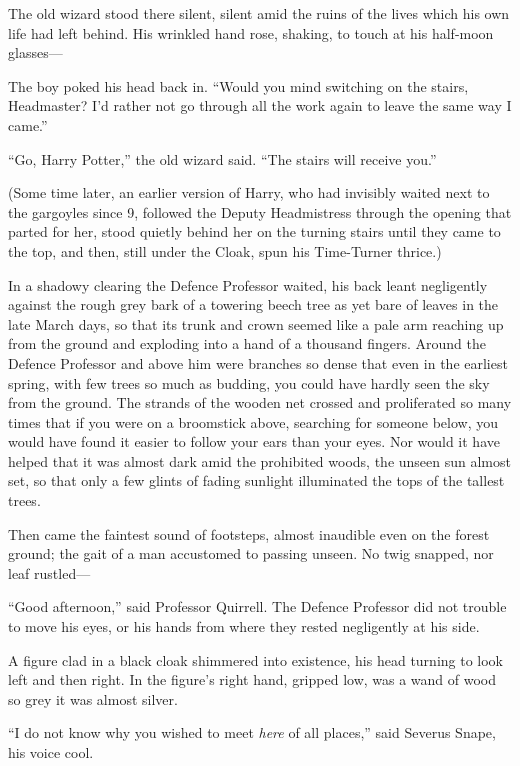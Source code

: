 The old wizard stood there silent, silent amid the ruins of the lives which his own life had left behind. His wrinkled hand rose, shaking, to touch at his half-moon glasses—

The boy poked his head back in. “Would you mind switching on the stairs, Headmaster? I’d rather not go through all the work again to leave the same way I came.”

“Go, Harry Potter,” the old wizard said. “The stairs will receive you.”

(Some time later, an earlier version of Harry, who had invisibly waited next to the gargoyles since 9\pm, followed the Deputy Headmistress through the opening that parted for her, stood quietly behind her on the turning stairs until they came to the top, and then, still under the Cloak, spun his Time-Turner thrice.)


In a shadowy clearing the Defence Professor waited, his back leant negligently against the rough grey bark of a towering beech tree as yet bare of leaves in the late March days, so that its trunk and crown seemed like a pale arm reaching up from the ground and exploding into a hand of a thousand fingers. Around the Defence Professor and above him were branches so dense that even in the earliest spring, with few trees so much as budding, you could have hardly seen the sky from the ground. The strands of the wooden net crossed and proliferated so many times that if you were on a broomstick above, searching for someone below, you would have found it easier to follow your ears than your eyes. Nor would it have helped that it was almost dark amid the prohibited woods, the unseen sun almost set, so that only a few glints of fading sunlight illuminated the tops of the tallest trees.

Then came the faintest sound of footsteps, almost inaudible even on the forest ground; the gait of a man accustomed to passing unseen. No twig snapped, nor leaf rustled—

“Good afternoon,” said Professor Quirrell. The Defence Professor did not trouble to move his eyes, or his hands from where they rested negligently at his side.

A figure clad in a black cloak shimmered into existence, his head turning to look left and then right. In the figure’s right hand, gripped low, was a wand of wood so grey it was almost silver.

“I do not know why you wished to meet \emph{here} of all places,” said Severus Snape, his voice cool.


